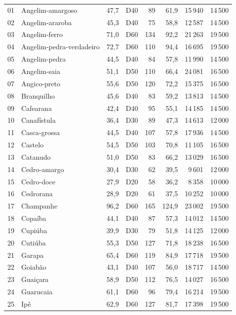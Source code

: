 \begin{appendices}
\begin{longtable}{@{}r p{} r c r r r r@{}}
01 & Angelim-amargoso & 47,7 & D40 & 89 & 61,9 & 15\,940 & 14\,500 \\
02 & Angelim-araroba & 45,3 & D40 & 75 & 58,8 & 12\,587 & 14\,500 \\
03 & Angelim-ferro & 71,0 & D60 & 134 & 92,2 & 21\,263 & 19\,500 \\
04 & Angelim-pedra-verdadeiro & 72,7 & D60 & 110 & 94,4 & 16\,695 & 19\,500 \\
05 & Angelim-pedra & 44,5 & D40 & 84 & 57,8 & 11\,990 & 14\,500 \\
06 & Angelim-saia & 51,1 & D50 & 110 & 66,4 & 24\,081 & 16\,500 \\
07 & Angico-preto & 55,6 & D50 & 120 & 72,2 & 15\,375 & 16\,500 \\
08 & Branquilho & 45,6 & D40 & 83 & 59,2 & 13\,813 & 14\,500 \\
09 & Cafearana & 42,4 & D40 & 95 & 55,1 & 14\,185 & 14\,500 \\
10 & Canafístula & 36,4 & D30 & 89 & 47,3 & 14\,613 & 12\,000 \\
11 & Casca-grossa & 44,5 & D40 & 107 & 57,8 & 17\,936 & 14\,500 \\
12 & Castelo & 54,5 & D50 & 103 & 70,8 & 11\,105 & 16\,500 \\
13 & Catanudo & 51,0 & D50 & 83 & 66,2 & 13\,029 & 16\,500 \\
14 & Cedro-amargo & 30,4 & D30 & 62 & 39,5 & 9\,601 & 12\,000 \\
15 & Cedro-doce & 27,9 & D20 & 58 & 36,2 & 8\,358 & 10\,000 \\
16 & Cedrorana & 28,9 & D20 & 61 & 37,5 & 10\,252 & 10\,000 \\
17 & Champanhe & 96,2 & D60 & 165 & 124,9 & 23\,002 & 19\,500 \\
18 & Copaíba & 44,1 & D40 & 87 & 57,3 & 14\,012 & 14\,500 \\
19 & Cupiúba & 39,9 & D30 & 79 & 51,8 & 14\,125 & 12\,000 \\
20 & Cutiúba & 55,3 & D50 & 127 & 71,8 & 18\,238 & 16\,500 \\
21 & Garapa & 65,4 & D60 & 119 & 84,9 & 17\,718 & 19\,500 \\
22 & Goiabão & 43,1 & D40 & 107 & 56,0 & 18\,717 & 14\,500 \\
23 & Guaiçara & 58,9 & D50 & 112 & 76,5 & 14\,027 & 16\,500 \\
24 & Guarucaia & 61,1 & D60 & 96 & 79,4 & 16\,214 & 19\,500 \\
25 & Ipê & 62,9 & D60 & 127 & 81,7 & 17\,398 & 19\,500 \\

\end{longtable}
\end{appendices}
